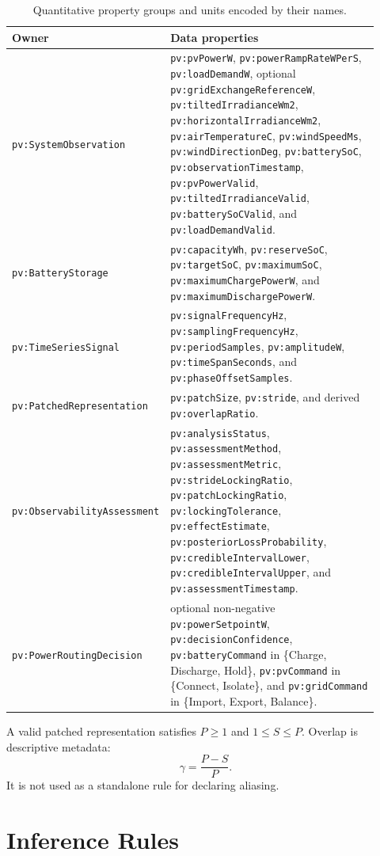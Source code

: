 \documentclass[
	letterpaper,
	10pt,
	unnumberedsections,
	twoside,
]{LTJournalArticle}
\newcommand{\pv}[1]{\texttt{pv:#1}}
\begin{document}
\begin{table}[H]
\centering
\small
\begin{tabular}{@{}L{0.29\linewidth}L{0.63\linewidth}@{}}
\toprule
\textbf{Owner} & \textbf{Data properties} \\
\midrule
\pv{SystemObservation} & \pv{pvPowerW}, \pv{powerRampRateWPerS}, \pv{loadDemandW}, optional \pv{gridExchangeReferenceW}, \pv{tiltedIrradianceWm2}, \pv{horizontalIrradianceWm2}, \pv{airTemperatureC}, \pv{windSpeedMs}, \pv{windDirectionDeg}, \pv{batterySoC}, \pv{observationTimestamp}, \pv{pvPowerValid}, \pv{tiltedIrradianceValid}, \pv{batterySoCValid}, and \pv{loadDemandValid}. \\
\pv{BatteryStorage} & \pv{capacityWh}, \pv{reserveSoC}, \pv{targetSoC}, \pv{maximumSoC}, \pv{maximumChargePowerW}, and \pv{maximumDischargePowerW}. \\
\pv{TimeSeriesSignal} & \pv{signalFrequencyHz}, \pv{samplingFrequencyHz}, \pv{periodSamples}, \pv{amplitudeW}, \pv{timeSpanSeconds}, and \pv{phaseOffsetSamples}. \\
\pv{PatchedRepresentation} & \pv{patchSize}, \pv{stride}, and derived \pv{overlapRatio}. \\
\pv{ObservabilityAssessment} & \pv{analysisStatus}, \pv{assessmentMethod}, \pv{assessmentMetric}, \pv{strideLockingRatio}, \pv{patchLockingRatio}, \pv{lockingTolerance}, \pv{effectEstimate}, \pv{posteriorLossProbability}, \pv{credibleIntervalLower}, \pv{credibleIntervalUpper}, and \pv{assessmentTimestamp}. \\
\pv{PowerRoutingDecision} & optional non-negative \pv{powerSetpointW}, \pv{decisionConfidence}, \pv{batteryCommand} in \{Charge, Discharge, Hold\}, \pv{pvCommand} in \{Connect, Isolate\}, and \pv{gridCommand} in \{Import, Export, Balance\}. \\
\bottomrule
\end{tabular}
\caption{Quantitative property groups and units encoded by their names.}
\label{tab:data}
\end{table}

A valid patched representation satisfies $P\geq1$ and $1\leq S\leq P$. Overlap is descriptive metadata:
\begin{equation}
\label{eq:overlap}
\gamma=\frac{P-S}{P}.
\end{equation}
It is not used as a standalone rule for declaring aliasing.

\section{Inference Rules}
\end{document}
